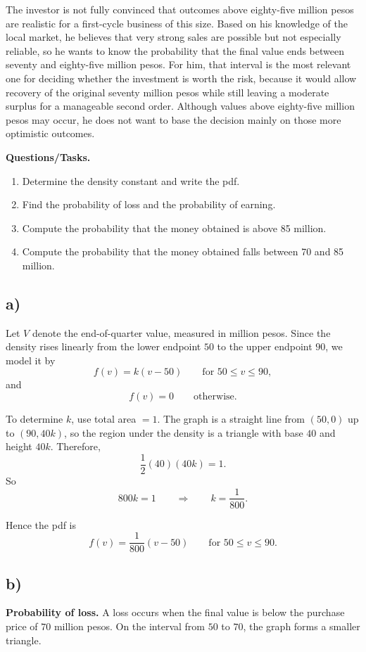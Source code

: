 	The investor is not fully convinced that outcomes above eighty-five million pesos are realistic for a first-cycle business of this size. Based on his knowledge of the local market, he believes that very strong sales are possible but not especially reliable, so he wants to know the probability that the final value ends between seventy and eighty-five million pesos. For him, that interval is the most relevant one for deciding whether the investment is worth the risk, because it would allow recovery of the original seventy million pesos while still leaving a moderate surplus for a manageable second order. Although values above eighty-five million pesos may occur, he does not want to base the decision mainly on those more optimistic outcomes.
	
	\textbf{Questions/Tasks.}
	\begin{enumerate}[label=\textbf{\alph*)}]
		\item Determine the density constant and write the pdf.
		\item Find the probability of loss and the probability of earning.
		\item Compute the probability that the money obtained is above 85 million.
		\item Compute the probability that the money obtained falls between 70 and 85 million.
	\end{enumerate}
	
	\subsection*{a)}
	Let $V$ denote the end-of-quarter value, measured in million pesos. Since the density rises linearly from the lower endpoint $50$ to the upper endpoint $90$, we model it by
	\[
	f(v)=k(v-50)\qquad \text{for }50\le v\le 90,
	\]
	and
	\[
	f(v)=0\qquad \text{otherwise.}
	\]
	
	To determine $k$, use total area $=1$. The graph is a straight line from $(50,0)$ up to $(90,40k)$, so the region under the density is a triangle with base $40$ and height $40k$. Therefore,
	\[
	\frac12(40)(40k)=1.
	\]
	So
	\[
	800k=1
	\qquad \Rightarrow \qquad
	k=\frac{1}{800}.
	\]
	
	Hence the pdf is
	\[
	f(v)=\frac{1}{800}(v-50)\qquad \text{for }50\le v\le 90.
	\]
	
	\subsection*{b)}
	\textbf{Probability of loss.} A loss occurs when the final value is below the purchase price of $70$ million pesos. On the interval from $50$ to $70$, the graph forms a smaller triangle.
	
